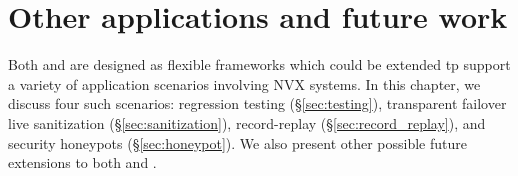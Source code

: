 \chapter{Other applications and future work}
\label{chap:applications}

Both \mx and \varan are designed as flexible frameworks which could be extended
tp support a variety of application scenarios involving NVX systems. In this
chapter, we discuss four such scenarios: regression testing
(\S\ref{sec:testing}), transparent failover live sanitization
(\S\ref{sec:sanitization}), record-replay (\S\ref{sec:record_replay}), and
security honeypots (\S\ref{sec:honeypot}). We also present other possible
future extensions to both \mx and \varan.










